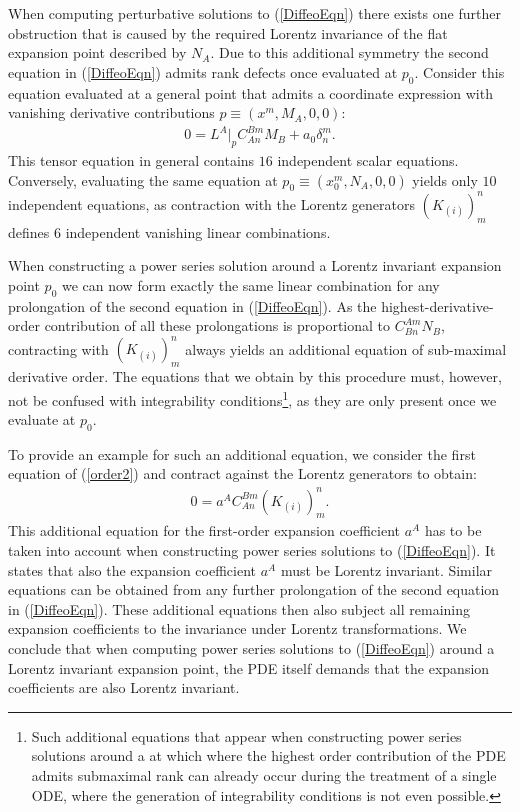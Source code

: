 \documentclass[%
 reprint,
nofootinbib,
 amsmath,amssymb,
 aps,
 prd,
floatfix,
]{revtex4-2}
\begin{document}
When computing perturbative solutions to (\ref{DiffeoEqn})  there exists one further obstruction that is caused by the required Lorentz invariance of the flat expansion point described by $N_A$. Due to this additional symmetry the second equation in (\ref{DiffeoEqn}) admits rank defects once evaluated at $p_0$. Consider this equation evaluated at a general point that admits a coordinate expression with vanishing derivative contributions $p \equiv (x^m,M_A,0,0)$:
\begin{align}
0 = L^A \big \vert_{p} C_{An}^{Bm}M_B + a_0 \delta^m_n.
\end{align}
This tensor equation in general contains $16$ independent scalar equations. Conversely, evaluating the same equation at $p_0\equiv (x_0^m, N_A,0,0)$ yields only $10$ independent equations, as contraction with the Lorentz generators $(K_{(i)})^n_m$ defines $6$ independent vanishing linear combinations.

When constructing a power series solution around a Lorentz invariant expansion point $p_0$ we can now form exactly the same linear combination for any prolongation of the second equation in (\ref{DiffeoEqn}). As the highest-derivative-order contribution of all these prolongations is proportional to $C^{Am}_{Bn}N_B$, contracting with $(K_{(i)})^n_m$ always yields an additional equation of sub-maximal derivative order. The equations that we obtain by this procedure must, however, not be confused with integrability conditions\footnote{Such additional equations that appear when constructing power series solutions around a at which where the highest order contribution of the PDE admits submaximal rank can already occur during the treatment of a single ODE, where the generation of integrability conditions is not even possible.}, as they are only present once we evaluate at $p_0$. 

To provide an example for such an additional equation, we consider the first equation of (\ref{order2}) and contract against the Lorentz generators to obtain:
\begin{align}\label{ansatz1}
    0 = a^A C^{Bm}_{An}  (K_{(i)})^n_m.
\end{align}
This additional equation for the first-order expansion coefficient $a^A$ has to be taken into account when constructing power series solutions to (\ref{DiffeoEqn}).
It states that also the expansion coefficient $a^A$ must be Lorentz invariant. 
Similar equations can be obtained from any further prolongation of the second equation in (\ref{DiffeoEqn}). These additional equations then also subject all remaining expansion coefficients to the invariance under Lorentz transformations.
We conclude that when computing power series solutions to (\ref{DiffeoEqn}) around a Lorentz invariant expansion point, the PDE itself demands that the expansion coefficients are also Lorentz invariant.
\end{document}

